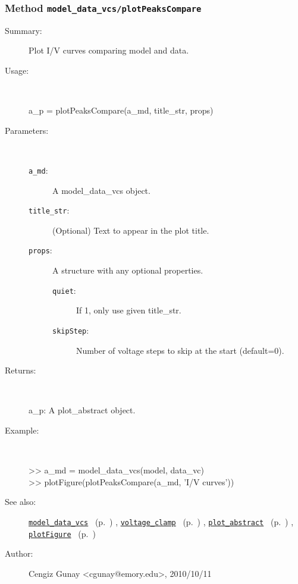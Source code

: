 \subsubsection[Method \texttt{plotPeaksCompare}]{Method \texttt{model\_data\_vcs/plotPeaksCompare}}%
%
\label{ref_model_data_vcs__plotPeaksCompare}%
\hypertarget{ref_model_data_vcs__plotPeaksCompare}{}%
\begin{description}
\item[Summary:]Plot I/V curves comparing model and data.
%
\item[Usage:]~%
\begin{lyxcode}%
a\_p = plotPeaksCompare(a\_md, title\_str, props)
%
\end{lyxcode}%
%
%
\item[Parameters:]~
\begin{description}%
\item[\texttt{a\_md}:]
 A model\_data\_vcs object.
\item[\texttt{title\_str}:]
 (Optional) Text to appear in the plot title.
\item[\texttt{props}:]
 A structure with any optional properties.
\begin{description}%
\item[\texttt{quiet}:]
 If 1, only use given title\_str.
\item[\texttt{skipStep}:]
 Number of voltage steps to skip at the start (default=0).
\end{description}%
\end{description}%
%
\item[Returns:
]~

   a\_p: A plot\_abstract object.
%
\item[Example:]~
\begin{lyxcode} >> a\_md = model\_data\_vcs(model, data\_vc)
\\%
 >> plotFigure(plotPeaksCompare(a\_md, 'I/V curves'))
\\%
\end{lyxcode}
%
\item[See also:]%
\hyperlink{ref_model_data_vcs}{\texttt{model\_data\_vcs}}%
\ (p.~\pageref{ref_model_data_vcs})%
%
, \hyperlink{ref_voltage_clamp}{\texttt{voltage\_clamp}}%
\ (p.~\pageref{ref_voltage_clamp})%
%
, \hyperlink{ref_plot_abstract}{\texttt{plot\_abstract}}%
\ (p.~\pageref{ref_plot_abstract})%
%
, \hyperlink{ref_plotFigure}{\texttt{plotFigure}}%
\ (p.~\pageref{ref_plotFigure})%
%
%
\item[Author:]%
Cengiz Gunay <cgunay@emory.edu>, 2010/10/11
%
\end{description}
\methodline%
